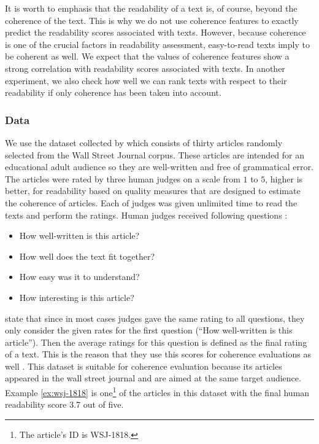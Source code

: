 It is worth to emphasis that the readability of a text is, of course, beyond the coherence of the text. 
This is why we do not use coherence features to exactly predict the readability scores associated with texts. 
However, because coherence is one of the crucial factors in readability assessment, easy-to-read texts imply to be  coherent as well. 
We expect that the values of coherence features show a strong correlation with readability scores associated with texts. 
In another experiment, we also check how well we can rank texts with respect to their readability if only coherence has been taken into account. 


\subsubsection{Data}
\label{sec:data_pitler}
We use the dataset collected by  which consists of thirty articles randomly selected from the Wall Street Journal corpus. 
These articles are intended for an educational adult audience so they are well-written and free of grammatical error. 
The articles were rated by three human judges on a scale from $1$ to $5$, higher is better, for readability based on quality measures that are designed to estimate the coherence of articles. 
Each of judges was given unlimited time to read the texts and perform the ratings. 
Human judges received following questions \cite{pitler08}:
\begin{itemize}
	\item How well-written is this article?
	\item How well does the text fit together?
	\item How easy was it to understand?
	\item How interesting is this article?
\end{itemize} 
 
 state that since in most cases judges gave the same rating to all questions, they only consider the given rates for the first question (``How well-written is this article''). 
Then the average ratings for this question is defined as the final rating of a text. 
This is the reason that they use this scores for coherence evaluations as well \cite{pitler08}. 
This dataset is suitable for coherence evaluation because its articles appeared in the wall street journal and are aimed at the same target audience. 
Example \ref{ex:wsj-1818} is one\footnote{The article's ID is WSJ-1818.} of the articles in this dataset with the final human readability score 3.7 out of five.  


